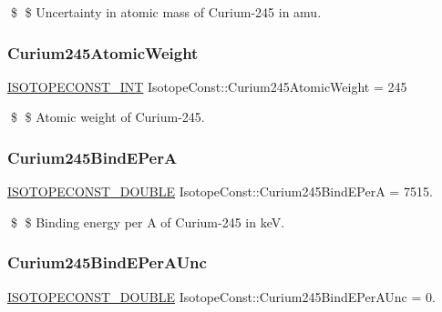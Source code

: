 \$ \$ Uncertainty in atomic mass of Curium-\/245 in amu. \mbox{\label{group___isotope_const-_curium-_cm245_gaf6a438d66acd680bed5680cb0aacb6e2}} 
\subsubsection{\texorpdfstring{Curium245\+Atomic\+Weight}{Curium245AtomicWeight}}
{\footnotesize\ttfamily \mbox{\hyperlink{group___isotope_const-_macros_ga5f18360b3e99483a35c32d789e62621c}{I\+S\+O\+T\+O\+P\+E\+C\+O\+N\+S\+T\+\_\+\+I\+NT}} Isotope\+Const\+::\+Curium245\+Atomic\+Weight = 245}

\$ \$ Atomic weight of Curium-\/245. \mbox{\label{group___isotope_const-_curium-_cm245_ga7b8e68331dcb2aa6c9d19bb38cec6ba5}} 
\subsubsection{\texorpdfstring{Curium245\+Bind\+E\+PerA}{Curium245BindEPerA}}
{\footnotesize\ttfamily \mbox{\hyperlink{group___isotope_const-_macros_ga8f45a7272ce02c0b4c65c44636ed719a}{I\+S\+O\+T\+O\+P\+E\+C\+O\+N\+S\+T\+\_\+\+D\+O\+U\+B\+LE}} Isotope\+Const\+::\+Curium245\+Bind\+E\+PerA = 7515.}

\$ \$ Binding energy per A of Curium-\/245 in keV. \mbox{\label{group___isotope_const-_curium-_cm245_gae375209ec7812088aa2abcac05b51350}} 
\subsubsection{\texorpdfstring{Curium245\+Bind\+E\+Per\+A\+Unc}{Curium245BindEPerAUnc}}
{\footnotesize\ttfamily \mbox{\hyperlink{group___isotope_const-_macros_ga8f45a7272ce02c0b4c65c44636ed719a}{I\+S\+O\+T\+O\+P\+E\+C\+O\+N\+S\+T\+\_\+\+D\+O\+U\+B\+LE}} Isotope\+Const\+::\+Curium245\+Bind\+E\+Per\+A\+Unc = 0.}


